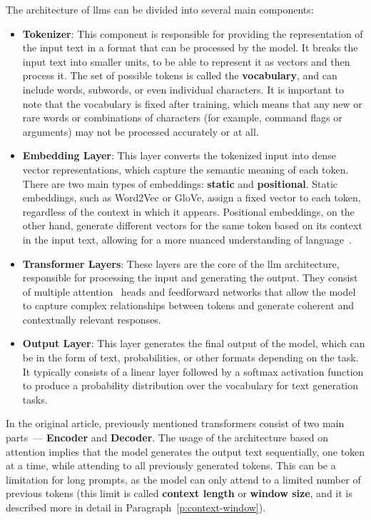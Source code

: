 The architecture of \glspl{llm} can be divided into several main components:
\begin{itemize}
  \item \textbf{Tokenizer}: This component is responsible for providing the
    representation of the input text in a format that can be processed by
    the model. It breaks the input text into smaller units, to be able to
    represent it as vectors and then process it. The set of possible tokens
    is called the \textbf{vocabulary}, and can include words, subwords, or
    even individual characters. It is important to note that the vocabulary
    is fixed after training, which means that any new or rare words or
    combinations of characters (for example, command flags or arguments) may
    not be processed accurately or at all.
  \item \textbf{Embedding Layer}\label{sec:emb-layer}: This layer
    converts the tokenized input
    into dense vector representations, which capture the semantic meaning
    of each token. There are two main types of embeddings: \textbf{static}
    and \textbf{positional}. Static embeddings, such as Word2Vec or GloVe,
    assign a fixed vector to each token, regardless of the context in which
    it appears. Positional embeddings, on the other hand, generate
    different vectors for the same token based on its context in the
    input text, allowing for a more nuanced understanding of
    language~\cite{mikolov2013distributed,pennington2014glove,zhao2023}.
  \item \textbf{Transformer Layers}: These layers are the core of the \gls{llm}
    architecture, responsible for processing the input and generating the
    output. They consist of multiple attention~\cite{attention} heads and
    feedforward networks that allow the model to capture complex
    relationships between tokens and generate coherent and contextually
    relevant responses.
  \item \textbf{Output Layer}: This layer generates the final output of the
    model, which can be in the form of text, probabilities, or other formats
    depending on the task. It typically consists of a linear layer followed by
    a softmax activation function to produce a probability distribution over the
    vocabulary for text generation tasks.
\end{itemize}

In the original article, previously mentioned transformers consist of two main
parts~--- \textbf{Encoder} and \textbf{Decoder}. The usage of the architecture
based on attention implies that the model generates the output text
sequentially, one token at a time, while attending to all previously generated
tokens. This can be a limitation for long prompts, as the model can only attend
to a limited number of previous tokens (this limit is called \textbf{context
length} or \textbf{window size}, and it is described more in detail in
Paragraph~\ref{p:context-window}).

